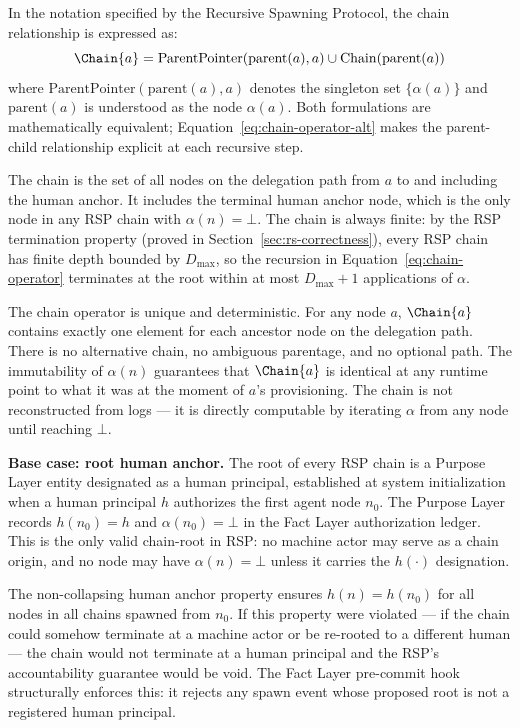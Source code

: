 In the notation specified by the Recursive Spawning Protocol, the chain relationship is expressed as:
\begin{equation}
\Chain{a} = \mathrm{ParentPointer}(\mathrm{parent}(a), a) \cup \mathrm{Chain}(\mathrm{parent}(a))
\label{eq:chain-operator-alt}
\end{equation}
where $\mathrm{ParentPointer}(\mathrm{parent}(a), a)$ denotes the singleton set $\{\alpha(a)\}$ and $\mathrm{parent}(a)$ is understood as the node $\alpha(a)$. Both formulations are mathematically equivalent; Equation~\ref{eq:chain-operator-alt} makes the parent-child relationship explicit at each recursive step.

The chain is the set of all nodes on the delegation path from $a$ to and including the human anchor. It includes the terminal human anchor node, which is the only node in any RSP chain with $\alpha(n) = \bot$. The chain is always finite: by the RSP termination property (proved in Section~\ref{sec:rs-correctness}), every RSP chain has finite depth bounded by $D_{\max}$, so the recursion in Equation~\ref{eq:chain-operator} terminates at the root within at most $D_{\max} + 1$ applications of $\alpha$.

The chain operator is unique and deterministic. For any node $a$, $\Chain{a}$ contains exactly one element for each ancestor node on the delegation path. There is no alternative chain, no ambiguous parentage, and no optional path. The immutability of $\alpha(n)$ guarantees that $\Chain{a}$ is identical at any runtime point to what it was at the moment of $a$'s provisioning. The chain is not reconstructed from logs --- it is directly computable by iterating $\alpha$ from any node until reaching $\bot$.

\medskip
\noindent\textbf{Base case: root human anchor.} The root of every RSP chain is a Purpose Layer entity designated as a human principal, established at system initialization when a human principal $h$ authorizes the first agent node $n_0$. The Purpose Layer records $h(n_0) = h$ and $\alpha(n_0) = \bot$ in the Fact Layer authorization ledger. This is the only valid chain-root in RSP: no machine actor may serve as a chain origin, and no node may have $\alpha(n) = \bot$ unless it carries the $h(\cdot)$ designation.

The non-collapsing human anchor property ensures $h(n) = h(n_0)$ for all nodes in all chains spawned from $n_0$. If this property were violated --- if the chain could somehow terminate at a machine actor or be re-rooted to a different human --- the chain would not terminate at a human principal and the RSP's accountability guarantee would be void. The Fact Layer pre-commit hook structurally enforces this: it rejects any spawn event whose proposed root is not a registered human principal.

